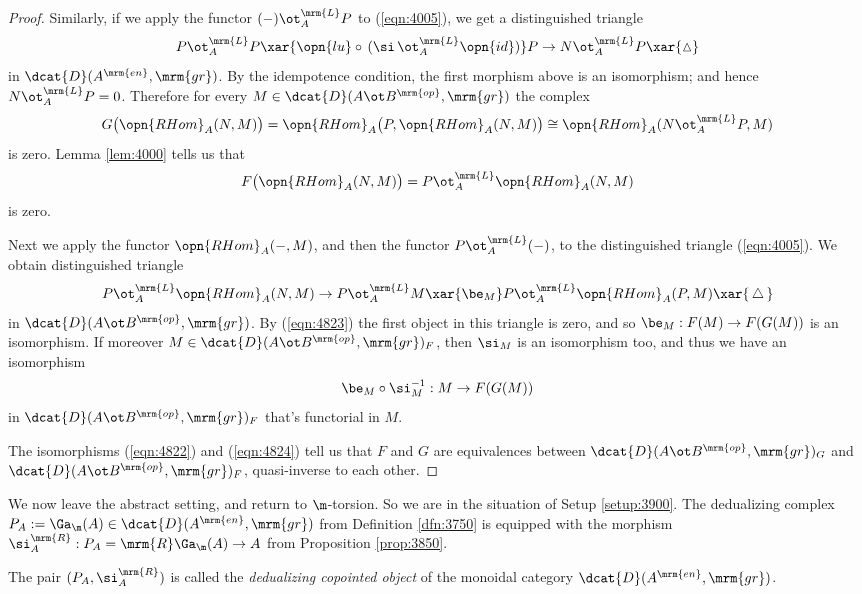 \begin{proof}
Similarly, if we apply the functor 
$(-) \ot_A^{\mrm{L}} P$ to (\ref{eqn:4005}), we get a distinguished triangle 
\[ P \ot_A^{\mrm{L}} P 
\xar{\opn{lu} \circ \, (\si \, \ot_A^{\mrm{L}} \opn{id})}
P \to N \ot_A^{\mrm{L}} P \xar{\vartriangle} \]
in $\dcat{D}(A^{\mrm{en}}, \mrm{gr})$.
By the idempotence condition, the first morphism above is an isomorphism; and 
hence $N \ot_A^{\mrm{L}} P = 0$. Therefore for every 
$M \in \dcat{D}(A \ot B^{\mrm{op}}, \mrm{gr})$ the complex
\[ G \bigl( \opn{RHom}_{A}(N, M) \bigr) = 
\opn{RHom}_{A} \bigl( P, \opn{RHom}_{A}(N, M) \bigr) \cong 
\opn{RHom}_{A}(N \ot_A^{\mrm{L}} P, M) \]
is zero. Lemma \ref{lem:4000} tells us that 
\begin{equation} \label{eqn:4823}
F \bigl( \opn{RHom}_{A}(N, M) \bigr) = 
P \ot_A^{\mrm{L}} \opn{RHom}_{A}(N, M) 
\end{equation}
is zero. 

Next we apply the functor $\opn{RHom}_{A}(-, M)$, 
and then the functor $P \ot_A^{\mrm{L}} (-)$, to the distinguished triangle 
(\ref{eqn:4005}). We obtain distinguished triangle 
\[ P \ot_A^{\mrm{L}} \opn{RHom}_{A}(N, M)  \to 
P \ot_A^{\mrm{L}} M \xar{\be_M}
P \ot_A^{\mrm{L}} \opn{RHom}_{A}(P, M)  \xar{ \, \triangle \, } \]
in $\dcat{D}(A \ot B^{\mrm{op}}, \mrm{gr})$. By (\ref{eqn:4823}) the first 
object in this triangle is zero, and so 
$\be_M : F(M) \to F(G(M))$ is an isomorphism. 
If moreover $M \in \dcat{D}(A \ot B^{\mrm{op}}, \mrm{gr})_F$, then $\si_M$ 
is an isomorphism too, and thus we have an isomorphism 
\begin{equation} \label{eqn:4824}
\be_M \circ \si_M^{-1} : M \to F(G(M))
\end{equation}
in $\dcat{D}(A \ot B^{\mrm{op}}, \mrm{gr})_F$ that's functorial in $M$.

The isomorphisms (\ref{eqn:4822}) and (\ref{eqn:4824}) tell us that 
$F$ and $G$ are equivalences between 
$\dcat{D}(A \ot B^{\mrm{op}}, \mrm{gr})_G$ and
$\dcat{D}(A \ot B^{\mrm{op}}, \mrm{gr})_F$, quasi-inverse to each other. 
\end{proof}

We now leave the abstract setting, and return to $\m$-torsion. 
So we are in the situation of Setup \ref{setup:3900}. 
The dedualizing complex 
$P_A := \Ga_{\m}(A) \in \dcat{D}(A^{\mrm{en}}, \mrm{gr})$
from Definition \ref{dfn:3750} is equipped with the morphism 
$\si^{\mrm{R}}_{A} : P_A = \mrm{R} \Ga_{\m}(A) \to A$
from Proposition \ref{prop:3850}. 

\begin{dfn} \label{dfn:4825}
The pair $(P_A, \si^{\mrm{R}}_{A})$ is called the 
{\em dedualizing copointed object}%
of the monoidal category $\dcat{D}(A^{\mrm{en}}, \mrm{gr})$. 
\end{dfn}

